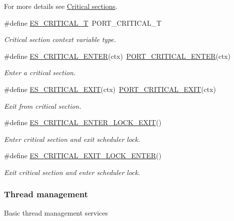 For more details see \hyperlink{critical_section}{Critical sections}. \begin{DoxyCompactItemize}
\item 
\#define \hyperlink{group__kern__intf_ga0420d9c03ac590d6e3e46fd17f6a739e}{E\-S\-\_\-\-C\-R\-I\-T\-I\-C\-A\-L\-\_\-\-T}~P\-O\-R\-T\-\_\-\-C\-R\-I\-T\-I\-C\-A\-L\-\_\-\-T
\begin{DoxyCompactList}\small\item\em Critical section context variable type. \end{DoxyCompactList}\item 
\#define \hyperlink{group__kern__intf_ga90ec47263e8a05b91fe9359c97eb1c9c}{E\-S\-\_\-\-C\-R\-I\-T\-I\-C\-A\-L\-\_\-\-E\-N\-T\-E\-R}(ctx)~\hyperlink{group__template__cpu__intf_gad230b116bf8bc513e64c533d4e946054}{P\-O\-R\-T\-\_\-\-C\-R\-I\-T\-I\-C\-A\-L\-\_\-\-E\-N\-T\-E\-R}(ctx)
\begin{DoxyCompactList}\small\item\em Enter a critical section. \end{DoxyCompactList}\item 
\#define \hyperlink{group__kern__intf_gade4fcc55ee1325723ed798a8c5e11e56}{E\-S\-\_\-\-C\-R\-I\-T\-I\-C\-A\-L\-\_\-\-E\-X\-I\-T}(ctx)~\hyperlink{group__template__cpu__intf_ga95082ec189f12ed8e39efbda811dea77}{P\-O\-R\-T\-\_\-\-C\-R\-I\-T\-I\-C\-A\-L\-\_\-\-E\-X\-I\-T}(ctx)
\begin{DoxyCompactList}\small\item\em Exit from critical section. \end{DoxyCompactList}\item 
\#define \hyperlink{group__kern__intf_gacf1dc7063de829a77484e4c9e1e942a5}{E\-S\-\_\-\-C\-R\-I\-T\-I\-C\-A\-L\-\_\-\-E\-N\-T\-E\-R\-\_\-\-L\-O\-C\-K\-\_\-\-E\-X\-I\-T}()
\begin{DoxyCompactList}\small\item\em Enter critical section and exit scheduler lock. \end{DoxyCompactList}\item 
\#define \hyperlink{group__kern__intf_ga4466c8aea583e299815926cd4d262a2c}{E\-S\-\_\-\-C\-R\-I\-T\-I\-C\-A\-L\-\_\-\-E\-X\-I\-T\-\_\-\-L\-O\-C\-K\-\_\-\-E\-N\-T\-E\-R}()
\begin{DoxyCompactList}\small\item\em Exit critical section and enter scheduler lock. \end{DoxyCompactList}\end{DoxyCompactItemize}
\subsubsection*{Thread management}
\label{_amgrp46313fcfd6f520b7cdcbf505c023e3a2}%
Basic thread management services

